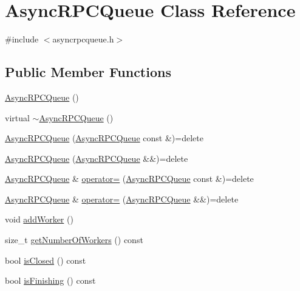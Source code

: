 \hypertarget{class_async_r_p_c_queue}{}\section{Async\+R\+P\+C\+Queue Class Reference}
\label{class_async_r_p_c_queue}


{\ttfamily \#include $<$asyncrpcqueue.\+h$>$}

\subsection*{Public Member Functions}
\begin{DoxyCompactItemize}
\item 
\mbox{\hyperlink{class_async_r_p_c_queue_a131571f208855382a03c22a98dfceb46}{Async\+R\+P\+C\+Queue}} ()
\item 
virtual \mbox{\hyperlink{class_async_r_p_c_queue_a5f5a7f5ed4135e12523863ae5c92f970}{$\sim$\+Async\+R\+P\+C\+Queue}} ()
\item 
\mbox{\hyperlink{class_async_r_p_c_queue_a47a6ce8effac4710a2691d855c9020d7}{Async\+R\+P\+C\+Queue}} (\mbox{\hyperlink{class_async_r_p_c_queue}{Async\+R\+P\+C\+Queue}} const \&)=delete
\item 
\mbox{\hyperlink{class_async_r_p_c_queue_a6f4360b02696e4e9f0a2d71d664b0663}{Async\+R\+P\+C\+Queue}} (\mbox{\hyperlink{class_async_r_p_c_queue}{Async\+R\+P\+C\+Queue}} \&\&)=delete
\item 
\mbox{\hyperlink{class_async_r_p_c_queue}{Async\+R\+P\+C\+Queue}} \& \mbox{\hyperlink{class_async_r_p_c_queue_a191ac9800b1ac534775a8b5bb0bf7972}{operator=}} (\mbox{\hyperlink{class_async_r_p_c_queue}{Async\+R\+P\+C\+Queue}} const \&)=delete
\item 
\mbox{\hyperlink{class_async_r_p_c_queue}{Async\+R\+P\+C\+Queue}} \& \mbox{\hyperlink{class_async_r_p_c_queue_a86c49425ecf86be42cfcbef1478c597f}{operator=}} (\mbox{\hyperlink{class_async_r_p_c_queue}{Async\+R\+P\+C\+Queue}} \&\&)=delete
\item 
void \mbox{\hyperlink{class_async_r_p_c_queue_a05370bb335972acfb00fd8c4e4f90db8}{add\+Worker}} ()
\item 
size\+\_\+t \mbox{\hyperlink{class_async_r_p_c_queue_a0ee8726139e10e2421bffa22509fa790}{get\+Number\+Of\+Workers}} () const
\item 
bool \mbox{\hyperlink{class_async_r_p_c_queue_aa9afd366a946e2b0a8dbb9438d3eee43}{is\+Closed}} () const
\item 
bool \mbox{\hyperlink{class_async_r_p_c_queue_a7efed3f584095c94ae2e594ed1555ec4}{is\+Finishing}} () const

\end{DoxyCompactItemize}
